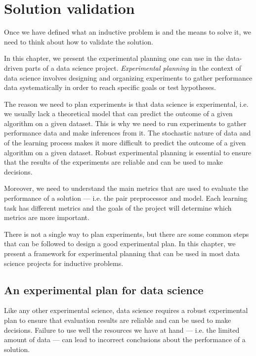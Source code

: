 \chapter{Solution validation}
\label{chap:planning}

Once we have defined what an inductive problem is and the means to solve it, we need to
think about how to validate the solution.

In this chapter, we present the experimental planning one can use in the data-driven
parts of a data science project.  \emph{Experimental planning}  in the context of data
science involves designing and organizing experiments to gather performance data
systematically in order to reach specific goals or test hypotheses.

The reason we need to plan experiments is that data science is experimental, i.e. we
usually lack a theoretical model that can predict the outcome of a given algorithm on a
given dataset.  This is why we need to run experiments to gather performance data and make
inferences from it.  The stochastic nature of data and of the learning process makes it
more difficult to predict the outcome of a given algorithm on a given dataset.  Robust
experimental planning is essential to ensure that the results of the experiments are
reliable and can be used to make decisions.

Moreover, we need to understand the main metrics that are used to evaluate the performance
of a solution --- i.e. the pair preprocessor and model.  Each learning task has different
metrics and the goals of the project will determine which metrics are more important.

There is not a single way to plan experiments, but there are some common steps that can
be followed to design a good experimental plan.  In this chapter, we present a
framework for experimental planning that can be used in most data science projects
for inductive problems.



\section{An experimental plan for data science}

Like any other experimental science, data science requires a robust experimental
plan to ensure that evaluation results are reliable and can be used to make decisions.
Failure to use well the resources we have at hand --- i.e. the limited amount of data ---
can lead to incorrect conclusions about the performance of a solution.

